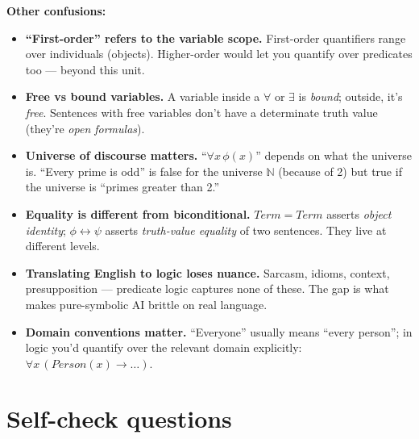 \documentclass[11pt, a4paper]{article}
\begin{document}
\textbf{Other confusions:}

\begin{itemize}
  \item \textbf{``First-order'' refers to the variable scope.} First-order quantifiers range over individuals (objects). Higher-order would let you quantify over predicates too — beyond this unit.
  \item \textbf{Free vs bound variables.} A variable inside a $\forall$ or $\exists$ is \emph{bound}; outside, it's \emph{free}. Sentences with free variables don't have a determinate truth value (they're \emph{open formulas}).
  \item \textbf{Universe of discourse matters.} ``$\forall x \, \phi(x)$'' depends on what the universe is. ``Every prime is odd'' is false for the universe $\mathbb{N}$ (because of 2) but true if the universe is ``primes greater than 2.''
  \item \textbf{Equality is different from biconditional.} $Term = Term$ asserts \emph{object identity}; $\phi \leftrightarrow \psi$ asserts \emph{truth-value equality} of two sentences. They live at different levels.
  \item \textbf{Translating English to logic loses nuance.} Sarcasm, idioms, context, presupposition — predicate logic captures none of these. The gap is what makes pure-symbolic AI brittle on real language.
  \item \textbf{Domain conventions matter.} ``Everyone'' usually means ``every person''; in logic you'd quantify over the relevant domain explicitly: $\forall x \, (Person(x) \rightarrow \dots)$.
\end{itemize}

\section*{Self-check questions}
\end{document}
